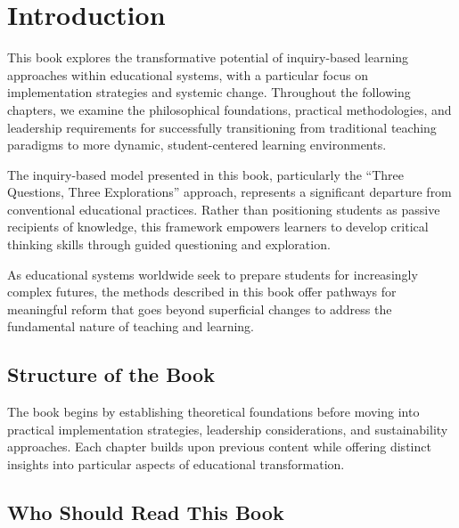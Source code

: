 \documentclass[
  Letterpaper,
]{scrbook}
\begin{document}
\chapter*{Introduction}\label{introduction}


This book explores the transformative potential of inquiry-based
learning approaches within educational systems, with a particular focus
on implementation strategies and systemic change. Throughout the
following chapters, we examine the philosophical foundations, practical
methodologies, and leadership requirements for successfully
transitioning from traditional teaching paradigms to more dynamic,
student-centered learning environments.

The inquiry-based model presented in this book, particularly the ``Three
Questions, Three Explorations'' approach, represents a significant
departure from conventional educational practices. Rather than
positioning students as passive recipients of knowledge, this framework
empowers learners to develop critical thinking skills through guided
questioning and exploration.

As educational systems worldwide seek to prepare students for
increasingly complex futures, the methods described in this book offer
pathways for meaningful reform that goes beyond superficial changes to
address the fundamental nature of teaching and learning.

\section*{Structure of the Book}\label{structure-of-the-book}


The book begins by establishing theoretical foundations before moving
into practical implementation strategies, leadership considerations, and
sustainability approaches. Each chapter builds upon previous content
while offering distinct insights into particular aspects of educational
transformation.

\section*{Who Should Read This Book}\label{who-should-read-this-book}
\end{document}
